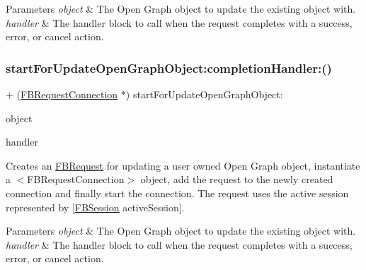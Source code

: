 \begin{DoxyParams}{Parameters}
{\em object} & The Open Graph object to update the existing object with.\\
\hline
{\em handler} & The handler block to call when the request completes with a success, error, or cancel action. \\
\hline
\end{DoxyParams}
\mbox{\label{interfaceFBRequestConnection_a481c4621f12410a7f6bbc7a0ccd6890b}} 
\subsubsection{\texorpdfstring{start\+For\+Update\+Open\+Graph\+Object\+:completion\+Handler\+:()}{startForUpdateOpenGraphObject:completionHandler:()}\hspace{0.1cm}{\footnotesize\ttfamily [4/5]}}
{\footnotesize\ttfamily + (\hyperlink{interfaceFBRequestConnection}{F\+B\+Request\+Connection} $\ast$) start\+For\+Update\+Open\+Graph\+Object\+: \begin{DoxyParamCaption}\item[{(id$<$ \hyperlink{protocolFBOpenGraphObject-p}{F\+B\+Open\+Graph\+Object} $>$)}]{object }\item[{completionHandler:(F\+B\+Request\+Handler)}]{handler }\end{DoxyParamCaption}}

Creates an {\ttfamily \hyperlink{interfaceFBRequest}{F\+B\+Request}} for updating a user owned Open Graph object, instantiate a $<$\+F\+B\+Request\+Connection$>$ object, add the request to the newly created connection and finally start the connection. The request uses the active session represented by {\ttfamily \mbox{[}\hyperlink{interfaceFBSession}{F\+B\+Session} active\+Session\mbox{]}}.


\begin{DoxyParams}{Parameters}
{\em object} & The Open Graph object to update the existing object with.\\
\hline
{\em handler} & The handler block to call when the request completes with a success, error, or cancel action. \\
\hline
\end{DoxyParams}
\mbox{\label{interfaceFBRequestConnection_a481c4621f12410a7f6bbc7a0ccd6890b}} 
